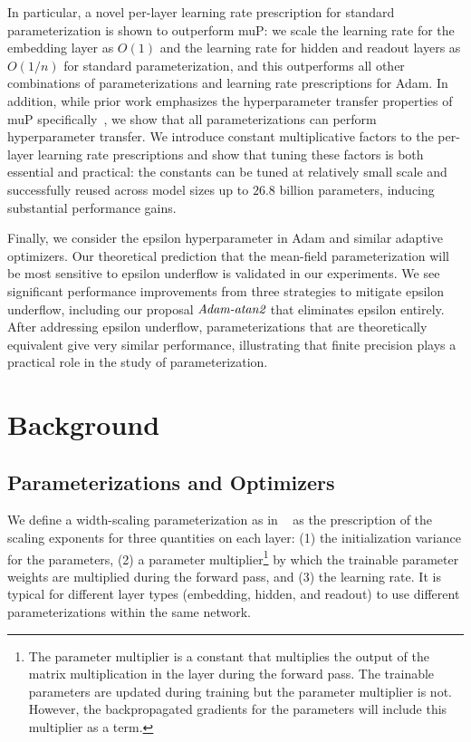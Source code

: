 \documentclass{article}
\theoremstyle{plain}
\theoremstyle{definition}
\theoremstyle{remark}
\begin{document}
In particular, a novel per-layer learning rate prescription for standard parameterization is shown to outperform muP: we scale the learning rate for the embedding layer as $O(1)$ and the learning rate for hidden and readout layers as $O(1/n)$ for standard parameterization, and this outperforms all other combinations of parameterizations and learning rate prescriptions for Adam. In addition, while prior work emphasizes the hyperparameter transfer properties of muP specifically~\citep{yang2022tensorv}, we show that all parameterizations can perform hyperparameter transfer. We introduce constant multiplicative factors to the per-layer learning rate prescriptions and show that tuning these factors is both essential and practical: the constants can be tuned at relatively small scale and successfully reused across model sizes up to $26.8$ billion parameters, inducing substantial performance gains.









Finally, we consider the epsilon hyperparameter in Adam and similar adaptive optimizers. Our theoretical prediction that the mean-field parameterization will be most sensitive to epsilon underflow is validated in our experiments. We see significant performance improvements from three strategies to mitigate epsilon underflow, including our proposal $\emph{Adam-atan2}$ that eliminates epsilon entirely. After addressing epsilon underflow, parameterizations that are theoretically equivalent give very similar performance, illustrating that finite precision plays a practical role in the study of parameterization.













\section{Background}
\label{sec:background}

\subsection{Parameterizations and Optimizers}
We define a width-scaling parameterization as in ~\citet{yang2021tensoriv} as the prescription of the scaling exponents for three quantities on each layer: (1) the initialization variance for the parameters, (2) a parameter multiplier\footnote{The parameter multiplier is a constant that multiplies the output of the matrix multiplication in the layer during the forward pass. The trainable parameters are updated during training but the parameter multiplier is not. However, the backpropagated gradients for the parameters will include this multiplier as a term.} by which the trainable parameter weights are multiplied during the forward pass, and (3) the learning rate. It is typical for different layer types (embedding, hidden, and readout) to use different parameterizations within the same network.
\end{document}
